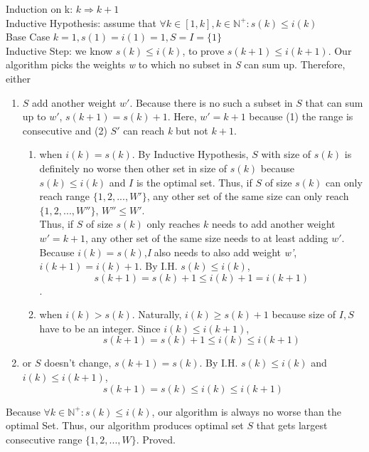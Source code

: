 \documentclass{article}
\begin{document}
            Induction on k: $k\Rightarrow k+1$\\
             Inductive Hypothesis: assume that $\forall k\in [1,k], k\in \mathbb{N}^{+}: s(k)\leq i(k)$\\
            Base Case $k = 1, s(1)=i(1)=1, S=I=\{1\}$\\
            Inductive Step: we know $s(k)\leq i(k)$, to prove $s(k+1)\leq i(k+1)$. Our algorithm picks the weights \textit{w} to which no subset in \textit{S} can sum up. Therefore, either \begin{enumerate}
                \item $S$ add another weight $w'$. Because there is no such a subset in $S$ that can sum up to $w'$, $s(k+1) = s(k) + 1$. Here, $w' = k+1$ because (1) the range is consecutive and (2) $S'$ can reach \textit{k} but not $k+1$.
                \begin{enumerate}
                    \item when $i(k) = s(k)$.  By Inductive Hypothesis, $S$ with size of $s(k)$ is definitely no worse then other set in size of $s(k)$ because $s(k)\leq i(k)$ and $I$ is the optimal set. Thus, if $S$ of size $s(k)$ can only reach range $\{1,2,...,W'\}$, any other set of the same size can only reach $\{1,2,...,W''\}$, $W''\leq W'$.\\
                    Thus, if $S$ of size $s(k)$ only reaches $k$ needs to add another weight $w'=k+1$, any other set of the same size needs to at least adding $w'$. Because $i(k)=s(k)$,\textit{I} also needs to also add weight \textit{w'}, $i(k+1) = i(k)+1$. By I.H. $s(k)\leq i(k)$, 
                    \[s(k+1)=s(k)+1\leq i(k)+1=i(k+1)\].
                    
                    \item when $i(k) > s(k)$. Naturally, $i(k) \geq s(k) + 1$ because size of $I, S$ have to be an integer. Since $i(k) \leq i(k+1)$, \[s(k+1)=s(k)+1\leq i(k)\leq i(k+1)\]
                    
                \end{enumerate}
                \item or $S$ doesn't change, $s(k+1) = s(k)$. By I.H. $s(k)\leq i(k)$ and $i(k)\leq i(k+1)$, \[s(k+1) = s(k) \leq i(k) \leq i(k+1)\]
                
            \end{enumerate}

            Because $\forall k\in \mathbb{N}^{+}: s(k)\leq i(k) $, our algorithm is always no worse than the optimal Set. Thus, our algorithm produces optimal set $S$ that gets largest consecutive range $\{1,2,...,W\}$. Proved.
\end{document}

